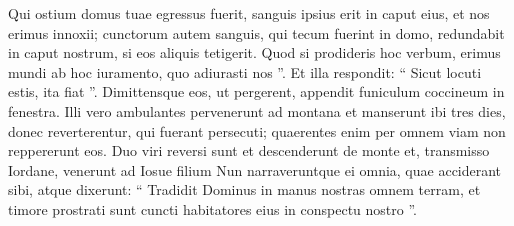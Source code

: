 \begin{biblechapter}
\begin{biblechapter}
 \verse Qui ostium domus tuae egressus fuerit, sanguis ipsius erit in caput eius, et nos erimus innoxii; cunctorum autem sanguis, qui tecum fuerint in domo, redundabit in caput nostrum, si eos aliquis tetigerit. 
\verse Quod si prodideris hoc verbum, erimus mundi ab hoc iuramento, quo adiurasti nos ”. 
\verse Et illa respondit: “ Sicut locuti estis, ita fiat ”. Dimittensque eos, ut pergerent, appendit funiculum coccineum in fenestra.
 \verse Illi vero ambulantes pervenerunt ad montana et manserunt ibi tres dies, donec reverterentur, qui fuerant persecuti; quaerentes enim per omnem viam non reppererunt eos. 
\verse Duo viri reversi sunt et descenderunt de monte et, transmisso Iordane, venerunt ad Iosue filium Nun narraveruntque ei omnia, quae acciderant sibi, 
\verse atque dixerunt: “ Tradidit Dominus in manus nostras omnem terram, et timore prostrati sunt cuncti habitatores eius in conspectu nostro ”.
 

\end{biblechapter}
\end{biblechapter}
